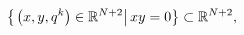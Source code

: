\begin{equation}
\left\{ \left. \left( x,y,q^{k}\right) \in \Bbb{R}^{N+2}\right| xy=0\right\}
\subset \Bbb{R}^{N+2},
\end{equation}


